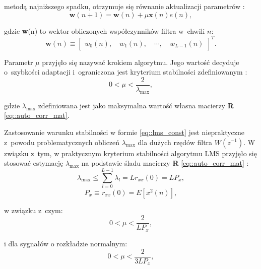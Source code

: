 \noindent metodą najniższego spadku, otrzymuje się równanie aktualizacji
parametrów \cite{bib:kuo_morgan}:
\begin{equation}
    \textbf{w}(n + 1) = \textbf{w}(n) + \mu\textbf{x}(n)e(n),
    \label{eq::lms}
\end{equation}

\noindent gdzie \textbf{w}(n) to wektor obliczonych współczynników filtra w~chwili $n$:
\begin{equation}
        \textbf{w}(n) \equiv \begin{bmatrix}
            w_0(n), \quad
            w_1(n), \quad
            \cdots, \quad
            w_{L - 1}(n)
        \end{bmatrix}^T.
\end{equation}

Parametr $\mu$ przyjęło się nazywać krokiem algorytmu. Jego wartość decyduje
o~szybkości adaptacji i~ograniczona jest kryterium stabilności zdefiniowanym
\cite{bib:kuo_morgan}:
\begin{equation}
    0 < \mu < \frac{2}{\lambda_{\text{max}}},
    \label{eq::lms_const}
\end{equation}

\noindent gdzie $\lambda_{\text{max}}$ zdefiniowana jest jako maksymalna wartość
własna macierzy \textbf{R} \ref{eq::auto_corr_mat}. \\
\par Zastosowanie warunku stabilności w formie \ref{eq::lms_const} jest
niepraktyczne z~powodu problematycznych obliczeń $\lambda_{\text{max}}$ dla
dużych rzędów filtra $W(z^{-1})$. W związku z~tym, w praktycznym kryterium
stabilności algorytmu LMS przyjęło się stosować estymację $\lambda_{\text{max}}$
na podstawie śladu macierzy \textbf{R} \ref{eq::auto_corr_mat}
\cite{bib:kuo_morgan}:
\begin{equation}
    \lambda_{\text{max}} \leq \sum_{l = 0}^{L - 1}\lambda_l = Lr_{xx}(0) = LP_x,
\end{equation}
\begin{equation}
    P_x \equiv r_{xx}(0) = E[x^2(n)],
\end{equation}

\noindent w związku z~czym:
\begin{equation}
    0 < \mu < \frac{2}{LP_x},
    \label{eq::lms_stab}
\end{equation}

\noindent i dla sygnałów o rozkładzie normalnym:
\begin{equation}
    0 < \mu < \frac{2}{3LP_x},
\end{equation}

